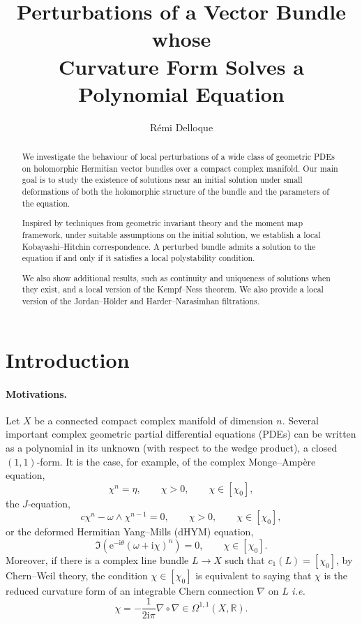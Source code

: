 \documentclass{article}
\title{Perturbations of a Vector Bundle whose \\ Curvature Form Solves a Polynomial Equation}
\author{Rémi Delloque}
\date{}
\theoremstyle{remark}
\theoremstyle{definition}
\newcommand{\R}{\mathbb{R}}
\renewcommand{\i}{\boldsymbol{\mathrm{i}}}
\newcommand{\e}{\boldsymbol{\mathrm{e}}}
\begin{document}
\maketitle
\begin{abstract}
    We investigate the behaviour of local perturbations of a wide class of geometric PDEs on holomorphic Hermitian vector bundles over a compact complex manifold. Our main goal is to study the existence of solutions near an initial solution under small deformations of both the holomorphic structure of the bundle and the parameters of the equation.
    
    Inspired by techniques from geometric invariant theory and the moment map framework, under suitable assumptions on the initial solution, we establish a local Kobayashi--Hitchin correspondence. A perturbed bundle admits a solution to the equation if and only if it satisfies a local polystability condition.

    We also show additional results, such as continuity and uniqueness of solutions when they exist, and a local version of the Kempf--Ness theorem. We also provide a local version of the Jordan--Hölder and Harder--Narasimhan filtrations.
\end{abstract}

\tableofcontents

\section{Introduction}

\paragraph{Motivations.}

Let $X$ be a connected compact complex manifold of dimension $n$. Several important complex geometric partial differential equations (PDEs) can be written as a polynomial in its unknown (with respect to the wedge product), a closed $(1,1)$-form. It is the case, for example, of the complex Monge--Ampère equation,
$$
\chi^n = \eta, \qquad \chi > 0, \qquad \chi \in [\chi_0],
$$
the $J$-equation,
$$
c\chi^n - \omega \wedge \chi^{n - 1} = 0, \qquad \chi > 0, \qquad \chi \in [\chi_0],
$$
or the deformed Hermitian Yang--Mills (dHYM) equation,
$$
\Im\left(\e^{-\i\theta}(\omega + \i\chi)^n\right) = 0, \qquad \chi \in [\chi_0].
$$
Moreover, if there is a complex line bundle $L \rightarrow X$ such that $c_1(L) = [\chi_0]$, by Chern--Weil theory, the condition $\chi \in [\chi_0]$ is equivalent to saying that $\chi$ is the reduced curvature form of an integrable Chern connection $\nabla$ on $L$ \textit{i.e.}
$$
\chi = -\frac{1}{2\i\pi}\nabla \circ \nabla \in \Omega^{1,1}(X,\R).
$$
\end{document}
